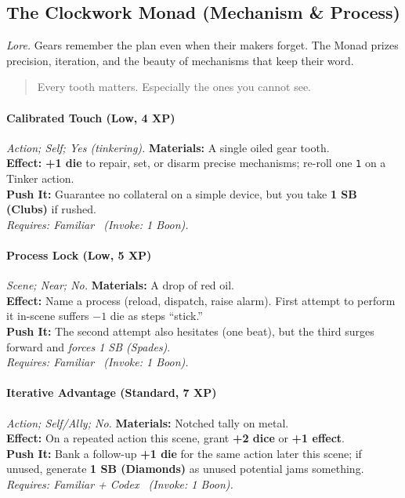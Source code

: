 \subsection{The Clockwork Monad (Mechanism \& Process)}
\textit{Lore.} Gears remember the plan even when their makers forget. The Monad prizes precision, iteration, and the beauty of mechanisms that keep their word.

\begin{quote}
Every tooth matters. Especially the ones you cannot see.
\end{quote}

\paragraph{Calibrated Touch (Low, 4 XP)} \emph{Action; Self; Yes (tinkering).}
\textbf{Materials:} A single oiled gear tooth.\\
\textbf{Effect:} \textbf{+1 die} to repair, set, or disarm precise mechanisms; re-roll one \texttt{1} on a Tinker action.\\
\textbf{Push It:} Guarantee no collateral on a simple device, but you take \textbf{1 SB (Clubs)} if rushed.\\
\emph{Requires: Familiar \ (\textit{Invoke:} 1 Boon).}

\paragraph{Process Lock (Low, 5 XP)} \emph{Scene; Near; No.}
\textbf{Materials:} A drop of red oil.\\
\textbf{Effect:} Name a process (reload, dispatch, raise alarm). First attempt to perform it in-scene suffers \(-1\) die as steps “stick.”\\
\textbf{Push It:} The second attempt also hesitates (one beat), but the third surges forward and \emph{forces 1 SB (Spades)}.\\
\emph{Requires: Familiar \ (\textit{Invoke:} 1 Boon).}

\paragraph{Iterative Advantage (Standard, 7 XP)} \emph{Action; Self/Ally; No.}
\textbf{Materials:} Notched tally on metal.\\
\textbf{Effect:} On a repeated action this scene, grant \textbf{+2 dice} or \textbf{+1 effect}.\\
\textbf{Push It:} Bank a follow-up \textbf{+1 die} for the same action later this scene; if unused, generate \textbf{1 SB (Diamonds)} as unused potential jams something.\\
\emph{Requires: Familiar + Codex \ (\textit{Invoke:} 1 Boon).}


